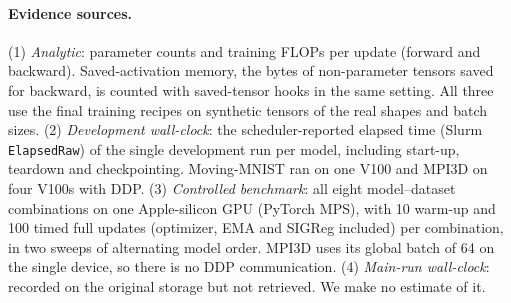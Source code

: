 \begin{table}[htbp]
\caption{Full cost record (post hoc; lower is better in every column; bold marks the lowest value per column and dataset). ``Bench.'' is the benchmark's CPU count of training GFLOPs per update, which appears in Table~\ref{tab:cost}. ``Math attn.'' recounts MPI3D with the math attention backend forced, so that attention matmuls are counted identically in every pass. Under the default backend they are counted in the no-gradient EMA pass but not in gradient-carrying passes; Moving-MNIST has no attention. The recount raises all MPI3D counts by about \VCostMathGain\% and leaves the \shvar{}/\emavar{} ratio unchanged (\VMPCostFlopsRatio{} in both). Saved activations are measured on MPS; the CPU recount with the math backend gives the same values to within 1 MiB. Development wall-clock is in Table~\ref{tab:cost}. ``Sweep 1 / 2'' are the median MPS update times of the two sweeps. Inference MFLOPs are per forecast (number of prior draws or atoms in parentheses), counted with the transformer fast path disabled.}
\label{tab:costfull}
\centering
\small
\setlength{\tabcolsep}{4pt}
\end{table}

\paragraph{Evidence sources.} (1) \emph{Analytic}: parameter counts and training FLOPs per update (forward and backward). Saved-activation memory, the bytes of non-parameter tensors saved for backward, is counted with saved-tensor hooks in the same setting. All three use the final training recipes on synthetic tensors of the real shapes and batch sizes. (2) \emph{Development wall-clock}: the scheduler-reported elapsed time (Slurm \texttt{ElapsedRaw}) of the single development run per model, including start-up, teardown and checkpointing. Moving-MNIST ran on one V100 and MPI3D on four V100s with DDP. (3) \emph{Controlled benchmark}: all eight model--dataset combinations on one Apple-silicon GPU (PyTorch MPS), with 10 warm-up and 100 timed full updates (optimizer, EMA and SIGReg included) per combination, in two sweeps of alternating model order. MPI3D uses its global batch of 64 on the single device, so there is no DDP communication. (4) \emph{Main-run wall-clock}: recorded on the original storage but not retrieved. We make no estimate of it.

